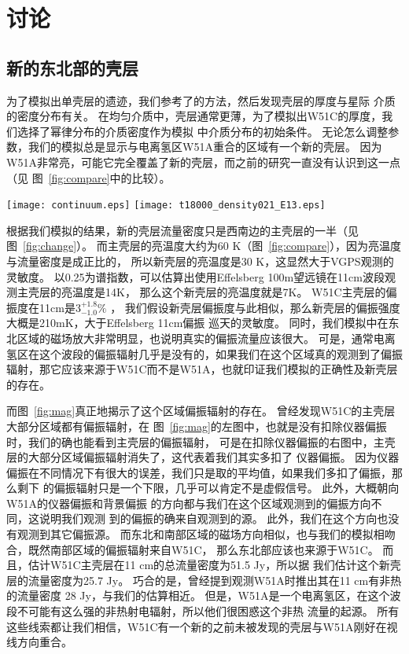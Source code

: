 \section{讨论}
\label{W51Cdis}
\subsection{新的东北部的壳层}
为了模拟出单壳层的遗迹，我们参考了\citet{Orlando2007}的方法，然后发现壳层的厚度与星际
介质的密度分布有关。
在均匀介质中，壳层通常更薄，为了模拟出W51C的厚度，我们选择了幂律分布的介质密度作为模拟
中介质分布的初始条件。
无论怎么调整参数，我们的模拟总是显示与电离氢区W51A重合的区域有一个新的壳层。
因为W51A非常亮，可能它完全覆盖了新的壳层，而之前的研究一直没有认识到这一点（见
图~\ref{fig:compare}中的比较）。

\begin{figure*}
   \centering
   \texttt{[image: continuum.eps]}
   \texttt{[image: t18000\_density021\_E13.eps]}
   \caption{左图显示了W51复合区的1420 MHz连续谱图。右图是图~\ref{fig:flux}右图，只是
   改变了颜色风格。取距离为4.3 kpc，两者有相同的大小。}
\label{fig:compare}
\end{figure*}

根据我们模拟的结果，新的壳层流量密度只是西南边的主壳层的一半（见图~\ref{fig:change}）。
而主壳层的亮温度大约为60 K（图~\ref{fig:compare}），因为亮温度与流量密度是成正比的，
所以新壳层的亮温度是30 K，这显然大于VGPS观测的灵敏度。
以0.25为谱指数，可以估算出使用Effelsberg 100m望远镜在11cm波段观测主壳层的亮温度是14K，
那么这个新壳层的亮温度就是7K。
W51C主壳层的偏振度在11cm是3$^{+1.8}_{-1.0}\%$ \citep{1974A&A....32..375V}，
我们假设新壳层偏振度与此相似，那么新壳层的偏振强度大概是210mK，大于Effelsberg 11cm偏振
巡天的灵敏度。
同时，我们模拟中在东北区域的磁场放大非常明显，也说明真实的偏振流量应该很大。
可是，通常电离氢区在这个波段的偏振辐射几乎是没有的，如果我们在这个区域真的观测到了偏振
辐射，那它应该来源于W51C而不是W51A，也就印证我们模拟的正确性及新壳层的存在。

而图~\ref{fig:mag}真正地揭示了这个区域偏振辐射的存在。
\citet{1974A&A....32..375V}曾经发现W51C的主壳层大部分区域都有偏振辐射，在
图~\ref{fig:mag}的左图中，也就是没有扣除仪器偏振时，我们的确也能看到主壳层的偏振辐射，
可是在扣除仪器偏振的右图中，主壳层的大部分区域偏振辐射消失了，这代表着我们其实多扣了
仪器偏振。
因为仪器偏振在不同情况下有很大的误差，我们只是取的平均值，如果我们多扣了偏振，那么剩下
的偏振辐射只是一个下限，几乎可以肯定不是虚假信号。
此外，大概朝向W51A的仪器偏振\citep{1987A&AS...69..451J}和背景偏振
\citep{1999A&A...350..447D}的方向都与我们在这个区域观测到的偏振方向不同，这说明我们观测
到的偏振的确来自观测到的源。
此外，我们在这个方向也没有观测到其它偏振源\citep{Xu2014}。
而东北和南部区域的磁场方向相似，也与我们的模拟相吻合，既然南部区域的偏振辐射来自W51C，
那么东北部应该也来源于W51C。
而且，\citet{1974A&A....32..375V}估计W51C主壳层在11 cm的总流量密度为51.5 Jy，所以据
我们估计这个新壳层的流量密度为25.7 Jy。
巧合的是，\citet{1994JKAS...27...81M}曾经提到观测W51A时推出其在11 cm有非热的流量密度
28 Jy，与我们的估算相近。
但是，W51A是一个电离氢区，在这个波段不可能有这么强的非热射电辐射，所以他们很困惑这个非热
流量的起源。
所有这些线索都让我们相信，W51C有一个新的之前未被发现的壳层与W51A刚好在视线方向重合。

